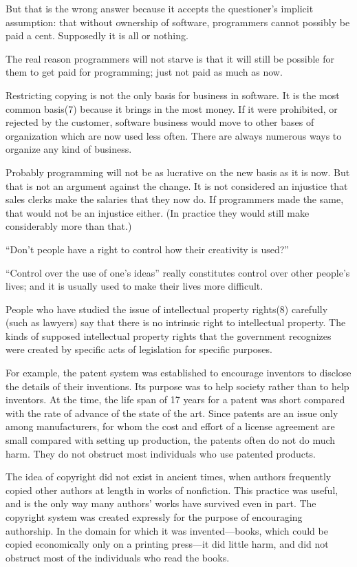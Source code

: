 But that is the wrong answer because it accepts the questioner's implicit assumption: that without ownership of software, programmers cannot possibly be paid a cent. Supposedly it is all or nothing.

The real reason programmers will not starve is that it will still be possible for them to get paid for programming; just not paid as much as now.

Restricting copying is not the only basis for business in software. It is the most common basis(7) because it brings in the most money. If it were prohibited, or rejected by the customer, software business would move to other bases of organization which are now used less often. There are always numerous ways to organize any kind of business.

Probably programming will not be as lucrative on the new basis as it is now. But that is not an argument against the change. It is not considered an injustice that sales clerks make the salaries that they now do. If programmers made the same, that would not be an injustice either. (In practice they would still make considerably more than that.)

“Don't people have a right to control how their creativity is used?”

“Control over the use of one's ideas” really constitutes control over other people's lives; and it is usually used to make their lives more difficult.

People who have studied the issue of intellectual property rights(8) carefully (such as lawyers) say that there is no intrinsic right to intellectual property. The kinds of supposed intellectual property rights that the government recognizes were created by specific acts of legislation for specific purposes.

For example, the patent system was established to encourage inventors to disclose the details of their inventions. Its purpose was to help society rather than to help inventors. At the time, the life span of 17 years for a patent was short compared with the rate of advance of the state of the art. Since patents are an issue only among manufacturers, for whom the cost and effort of a license agreement are small compared with setting up production, the patents often do not do much harm. They do not obstruct most individuals who use patented products.

The idea of copyright did not exist in ancient times, when authors frequently copied other authors at length in works of nonfiction. This practice was useful, and is the only way many authors' works have survived even in part. The copyright system was created expressly for the purpose of encouraging authorship. In the domain for which it was invented—books, which could be copied economically only on a printing press—it did little harm, and did not obstruct most of the individuals who read the books.

